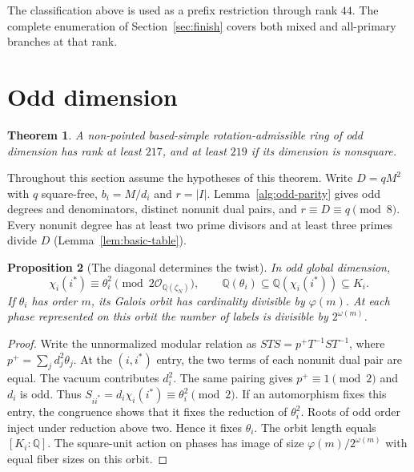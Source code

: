 \documentclass[11pt]{amsart}
\numberwithin{equation}{section}
\newtheorem{theorem}{Theorem}[section]
\newtheorem{proposition}[theorem]{Proposition}
\theoremstyle{definition}
\theoremstyle{plain}
\newcommand{\QQ}{\mathbb Q}
\begin{document}
The classification above is used as a prefix restriction through rank
$44$. The complete enumeration of Section~\ref{sec:finish} covers
both mixed and all-primary branches at that rank.

\section{Odd dimension}\label{sec:odd-new}
\begin{theorem}\label{odd:rank}
A non-pointed based-simple rotation-admissible ring of odd dimension
has rank at least $217$, and at least $219$ if its dimension is nonsquare.
\end{theorem}
Throughout this section assume the hypotheses of this theorem.
Write $D=qM^2$ with $q$ square-free, $b_i=M/d_i$ and $r=|I|$.
Lemma~\ref{alg:odd-parity} gives odd degrees and denominators,
distinct nonunit dual pairs, and $r\equiv D\equiv q\pmod8$. Every nonunit degree has at least two
prime divisors and at least three primes divide $D$
(Lemma~\ref{lem:basic-table}).

\begin{proposition}[The diagonal determines the twist]\label{odd:diagonal-twist}
In odd global dimension,
\[
 \chi_i(i^*)\equiv\theta_i^2\pmod{2\mathcal O_{\QQ(\zeta_N)}},
 \qquad \QQ(\theta_i)\subseteq\QQ(\chi_i(i^*))\subseteq K_i .
\]
If $\theta_i$ has order $m$, its Galois orbit has cardinality divisible
by $\varphi(m)$. At each phase represented on this orbit the number of
labels is divisible by $2^{\omega(m)}$.
\end{proposition}
\begin{proof}
Write the unnormalized modular relation as $STS=p^+T^{-1}ST^{-1}$,
where $p^+=\sum_j d_j^2\theta_j$. At the $(i,i^*)$ entry, the two terms
of each nonunit dual pair are equal. The vacuum contributes $d_i^2$.
The same pairing gives $p^+\equiv1\pmod2$ and $d_i$ is odd. Thus
$S_{ii^*}=d_i\chi_i(i^*)\equiv\theta_i^2\pmod2$. If an automorphism
fixes this entry, the congruence shows that it fixes the reduction of
$\theta_i^2$. Roots of odd order inject under reduction above two.
Hence it fixes $\theta_i$. The orbit length equals $[K_i:\QQ]$.
The square-unit action on phases has image of size
$\varphi(m)/2^{\omega(m)}$ with equal fiber sizes on this orbit.
\end{proof}
\end{document}
